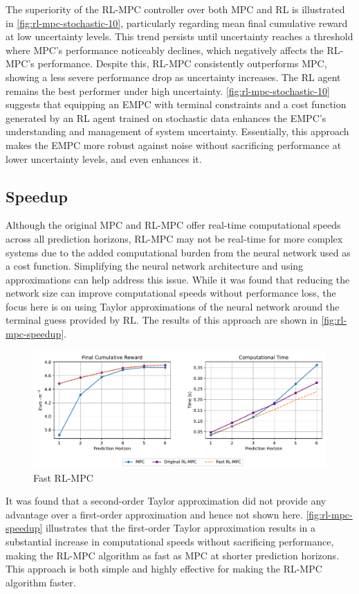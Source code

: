 The superiority of the RL-MPC controller over both MPC and RL is illustrated in \autoref{fig:rl-mpc-stochastic-10}, particularly regarding mean final cumulative reward at low uncertainty levels. This trend persists until uncertainty reaches a threshold where MPC's performance noticeably declines, which negatively affects the RL-MPC's performance. Despite this, RL-MPC consistently outperforms MPC, showing a less severe performance drop as uncertainty increases. The RL agent remains the best performer under high uncertainty. \autoref{fig:rl-mpc-stochastic-10} suggests that equipping an EMPC with terminal constraints and a cost function generated by an RL agent trained on stochastic data enhances the EMPC's understanding and management of system uncertainty. Essentially, this approach makes the EMPC more robust against noise without sacrificing performance at lower uncertainty levels, and even enhances it.


\subsection{Speedup}
Although the original MPC and RL-MPC offer real-time computational speeds across all prediction horizons, RL-MPC may not be real-time for more complex systems due to the added computational burden from the neural network used as a cost function. Simplifying the neural network architecture and using approximations can help address this issue. While it was found that reducing the network size can improve computational speeds without performance loss, the focus here is on using Taylor approximations of the neural network around the terminal guess provided by RL. The results of this approach are shown in \autoref{fig:rl-mpc-speedup}.

\begin{figure}[h]
	\centering
	\includegraphics[width=\linewidth]{figures/final_speed_up.pdf}
	\caption{Fast RL-MPC}
	\label{fig:rl-mpc-speedup}
\end{figure}


It was found that a second-order Taylor approximation did not provide any advantage over a first-order approximation and hence not shown here. \autoref{fig:rl-mpc-speedup} illustrates that the first-order Taylor approximation results in a substantial increase in computational speeds without sacrificing performance, making the RL-MPC algorithm as fast as MPC at shorter prediction horizons. This approach is both simple and highly effective for making the RL-MPC algorithm faster.
